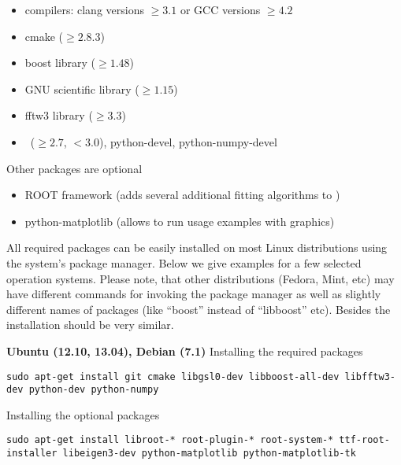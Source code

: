 \begin{itemize}
\item compilers: clang  versions $\geq 3.1$ or GCC versions $\geq 4.2$
\item cmake ($\geq 2.8.3$)
\item boost library ($\geq 1.48$)
\item GNU scientific library ($\geq 1.15$)
\item fftw3 library ($\geq 3.3$)
\item \Python\ ($\geq 2.7$, $< 3.0$), python-devel, python-numpy-devel
\end{itemize}
\vspace*{2mm}

Other packages are optional
\begin{itemize}
\item ROOT framework (adds several additional fitting algorithms to \BornAgain)
\item python-matplotlib (allows to run usage examples with graphics)
\end{itemize}

All required packages can be easily installed on most Linux distributions using the system's package
manager. Below we give examples for a few selected operation systems. Please note,
that other distributions (Fedora, Mint, etc) may have different
commands for invoking the package manager as well as slightly different names of packages (like ``boost'' instead of ``libboost'' etc). Besides  the installation should be very similar.
\vspace*{3mm}


\noindent
{\large\bf Ubuntu (12.10, 13.04), Debian (7.1)} \newline
Installing the required packages
\begin{lstlisting}[language=shell, style=commandline]
sudo apt-get install git cmake libgsl0-dev libboost-all-dev libfftw3-dev python-dev python-numpy
\end{lstlisting}

\noindent
Installing the optional packages
\begin{lstlisting}[language=shell, style=commandline]
sudo apt-get install libroot-* root-plugin-* root-system-* ttf-root-installer libeigen3-dev python-matplotlib python-matplotlib-tk
\end{lstlisting}
\vspace*{3mm}


